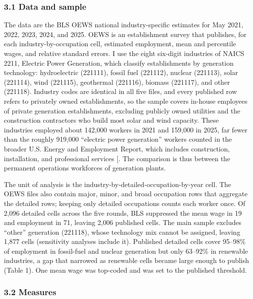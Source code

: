 \documentclass[
  11pt,
]{article}
\begin{document}
\subsubsection{3.1 Data and sample}\label{data-and-sample}

The data are the BLS OEWS national industry-specific estimates for May
2021, 2022, 2023, 2024, and 2025. OEWS is an establishment survey that
publishes, for each industry-by-occupation cell, estimated employment,
mean and percentile wages, and relative standard errors. I use the eight
six-digit industries of NAICS 2211, Electric Power Generation, which
classify establishments by generation technology: hydroelectric
(221111), fossil fuel (221112), nuclear (221113), solar (221114), wind
(221115), geothermal (221116), biomass (221117), and other (221118).
Industry codes are identical in all five files, and every published row
refers to privately owned establishments, so the sample covers in-house
employees of private generation establishments, excluding publicly owned
utilities and the construction contractors who build most solar and wind
capacity. These industries employed about 142,000 workers in 2021 and
159,000 in 2025, far fewer than the roughly 919,000 ``electric power
generation'' workers counted in the broader U.S. Energy and Employment
Report, which includes construction, installation, and professional
services {[}\citeproc{ref-doe2024useer}{11}{]}. The comparison is thus
between the permanent operations workforces of generation plants.

The unit of analysis is the industry-by-detailed-occupation-by-year
cell. The OEWS files also contain major, minor, and broad occupation
rows that aggregate the detailed rows; keeping only detailed occupations
counts each worker once. Of 2,096 detailed cells across the five rounds,
BLS suppressed the mean wage in 19 and employment in 71, leaving 2,006
published cells. The main sample excludes ``other'' generation (221118),
whose technology mix cannot be assigned, leaving 1,877 cells
(sensitivity analyses include it). Published detailed cells cover
95--98\% of employment in fossil-fuel and nuclear generation but only
63--92\% in renewable industries, a gap that narrowed as renewable cells
became large enough to publish (Table 1). One mean wage was top-coded
and was set to the published threshold.

\subsubsection{3.2 Measures}\label{measures}
\end{document}
